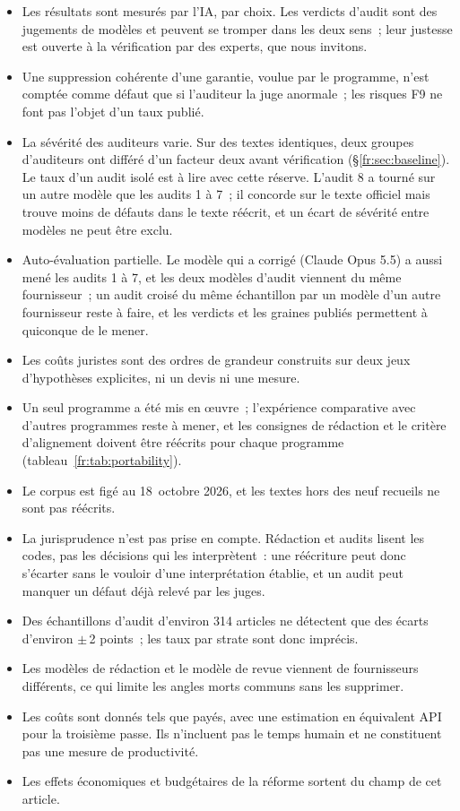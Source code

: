 \documentclass[11pt,a4paper]{article}
\begin{document}
\begin{itemize}
  \item Les résultats sont mesurés par l'IA, par choix. Les verdicts d'audit sont des jugements de modèles et peuvent se tromper dans les deux sens~; leur justesse est ouverte à la vérification par des experts, que nous invitons.
  \item Une suppression cohérente d'une garantie, voulue par le programme, n'est comptée comme défaut que si l'auditeur la juge anormale~; les risques F9 ne font pas l'objet d'un taux publié.
  \item La sévérité des auditeurs varie. Sur des textes identiques, deux groupes d'auditeurs ont différé d'un facteur deux avant vérification (\S\ref{fr:sec:baseline}). Le taux d'un audit isolé est à lire avec cette réserve. L'audit 8 a tourné sur un autre modèle que les audits 1 à 7~; il concorde sur le texte officiel mais trouve moins de défauts dans le texte réécrit, et un écart de sévérité entre modèles ne peut être exclu.
  \item Auto-évaluation partielle. Le modèle qui a corrigé (Claude Opus 5.5) a aussi mené les audits 1 à 7, et les deux modèles d'audit viennent du même fournisseur~; un audit croisé du même échantillon par un modèle d'un autre fournisseur reste à faire, et les verdicts et les graines publiés permettent à quiconque de le mener.
  \item Les coûts \og juristes \fg{} sont des ordres de grandeur construits sur deux jeux d'hypothèses explicites, ni un devis ni une mesure.
  \item Un seul programme a été mis en \oe{}uvre~; l'expérience comparative avec d'autres programmes reste à mener, et les consignes de rédaction et le critère d'alignement doivent être réécrits pour chaque programme (tableau~\ref{fr:tab:portability}).
  \item Le corpus est figé au 18~octobre 2026, et les textes hors des neuf recueils ne sont pas réécrits.
  \item La jurisprudence n'est pas prise en compte. Rédaction et audits lisent les codes, pas les décisions qui les interprètent~: une réécriture peut donc s'écarter sans le vouloir d'une interprétation établie, et un audit peut manquer un défaut déjà relevé par les juges.
  \item Des échantillons d'audit d'environ 314 articles ne détectent que des écarts d'environ $\pm$\,2 points~; les taux par strate sont donc imprécis.
  \item Les modèles de rédaction et le modèle de revue viennent de fournisseurs différents, ce qui limite les angles morts communs sans les supprimer.
  \item Les coûts sont donnés tels que payés, avec une estimation en équivalent API pour la troisième passe. Ils n'incluent pas le temps humain et ne constituent pas une mesure de productivité.
  \item Les effets économiques et budgétaires de la réforme sortent du champ de cet article.
\end{itemize}
\end{document}
